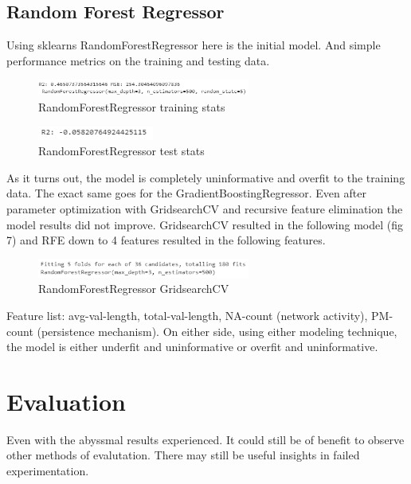 \documentclass[conference]{IEEEtran}
\begin{document}
\subsection{Random Forest Regressor}
Using sklearns RandomForestRegressor here is the initial model. And simple performance metrics on the training and testing data.
\begin{figure}[h]
\centerline{\includegraphics[width=2.75in, height=.25in]{rfrinitial.PNG}}
\caption{RandomForestRegressor training stats}
\label{fig}
\end{figure}
\begin{figure}[h]
\centerline{\includegraphics[width=1.5in, height=.125in]{R2test.PNG}}
\caption{RandomForestRegressor test stats}
\label{fig}
\end{figure}
As it turns out, the model is completely uninformative and overfit to the training data. The exact same goes for the GradientBoostingRegressor. Even after parameter optimization with GridsearchCV and recursive feature elimination the model results did not improve. GridsearchCV resulted in the following model (fig 7) and RFE down to 4 features resulted in the following features.\\
\begin{figure}[h]
\centerline{\includegraphics[width=2.75in, height=.25in]{gridsearch.PNG}}
\caption{RandomForestRegressor GridsearchCV}
\label{fig}
\end{figure}
Feature list: avg-val-length, total-val-length, NA-count (network activity), PM-count (persistence mechanism).
On either side, using either modeling technique, the model is either underfit and uninformative or overfit and uninformative.
\section{Evaluation}
Even with the abyssmal results experienced. It could still be of benefit to observe other methods of evalutation. There may still be useful insights in failed experimentation.
\end{document}
